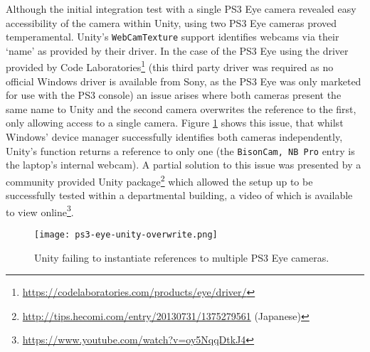 Although the initial integration test with a single PS3 Eye camera revealed easy accessibility of the camera within Unity, using two PS3 Eye cameras proved temperamental. Unity's \texttt{WebCamTexture} support identifies webcams via their `name' as provided by their driver. In the case of the PS3 Eye using the driver provided by Code Laboratories\footnote{\url{https://codelaboratories.com/products/eye/driver/}} (this third party driver was required as no official Windows driver is available from Sony, as the PS3 Eye was only marketed for use with the PS3 console) an issue arises where both cameras present the same name to Unity and the second camera overwrites the reference to the first, only allowing access to a single camera. Figure \ref{ps3-eye-unity-overwrite.png} shows this issue, that whilst Windows' device manager successfully identifies both cameras independently, Unity's  function returns a reference to only one (the \texttt{BisonCam, NB Pro} entry is the laptop's internal webcam). A partial solution to this issue was presented by a community provided Unity package\footnote{\url{http://tips.hecomi.com/entry/20130731/1375279561} (Japanese)} which allowed the setup up to be successfully tested within a departmental building, a video of which is available to view online\footnote{\url{https://www.youtube.com/watch?v=oy5NqqDtkJ4}}.

\begin{figure}[h]
	\begin{center}
		\texttt{[image: ps3-eye-unity-overwrite.png]}
		\caption{Unity failing to instantiate references to multiple PS3 Eye cameras.}
		\label{ps3-eye-unity-overwrite.png}
	\end{center}
\end{figure}

